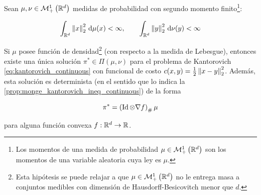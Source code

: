 \begin{teo}[Brenier]
	\label{teo:brenier}
	Sean $\mu,\nu\in\mathcal{M}_+^1\left(\mathbb{R}^d\right)$ medidas de probabilidad con segundo momento finito\footnote{Los momentos de una medida de probabilidad $\mu\in\mathcal{M}_+^1\left(\mathbb{R}^d\right)$ son los momentos de una variable aleatoria cuya ley es $\mu$.}:

	\begin{equation}
		\int_{\mathbb{R}^d} \left\lVert x \right\rVert_2^2 \,\operatorname{d}\!\mu(x)<\infty,
		\qquad
		\int_{\mathbb{R}^d} \left\lVert y \right\rVert_2^2 \,\operatorname{d}\!\nu(y)<\infty
	\end{equation}

	Si $\mu$ posee función de densidad\footnote{Esta hipótesis se puede relajar a que $\mu\in\mathcal{M}_+^1\left(\mathbb{R}^d\right)$ no le entrega masa a conjuntos medibles con dimensión de Hausdorff-Besicovitch menor que $d$.} (con respecto a la medida de Lebesgue), entonces existe una única solución $\pi^*\in\Pi(\mu,\nu)$ para el problema de Kantorovich \eqref{eq:kantorovich_continuous} con funcional de costo $c(x,y)=\frac{1}{2}\left\lVert x-y \right\rVert_2^2$. Además, esta solución es determinista (en el sentido que lo indica la \autoref{prop:monge_kantorovich_ineq_continuous}) de la forma

	\begin{equation}
		\pi^* = \left(\operatorname{Id}\otimes \nabla f\right)_\#\mu
	\end{equation}

	para alguna función convexa $f:\mathbb{R}^d\to\mathbb{R}$.
\end{teo}

